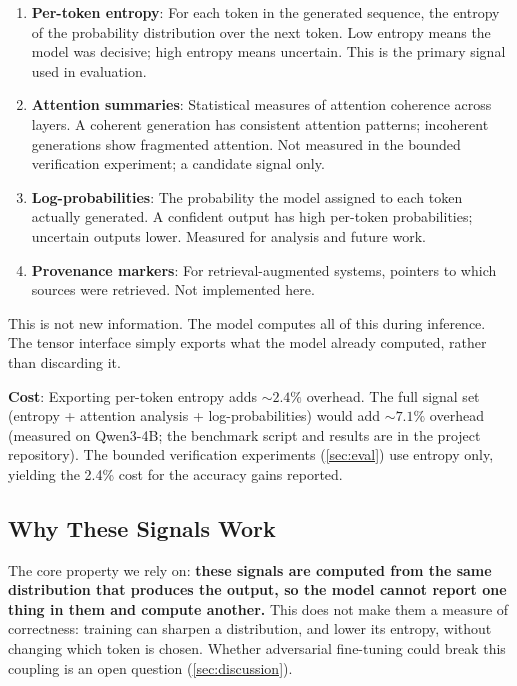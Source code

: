 \documentclass[11pt]{article}
\begin{document}
\begin{enumerate}
    \item \textbf{Per-token entropy}: For each token in the generated sequence, the entropy of the probability distribution over the next token. Low entropy means the model was decisive; high entropy means uncertain. This is the primary signal used in evaluation.

    \item \textbf{Attention summaries}: Statistical measures of attention coherence across layers. A coherent generation has consistent attention patterns; incoherent generations show fragmented attention. Not measured in the bounded verification experiment; a candidate signal only.

    \item \textbf{Log-probabilities}: The probability the model assigned to each token actually generated. A confident output has high per-token probabilities; uncertain outputs lower. Measured for analysis and future work.

    \item \textbf{Provenance markers}: For retrieval-augmented systems, pointers to which sources were retrieved. Not implemented here.
\end{enumerate}

This is not new information. The model computes all of this during inference. The tensor interface simply exports what the model already computed, rather than discarding it.

\textbf{Cost}: Exporting per-token entropy adds ${\sim}2.4\%$ overhead. The full signal set (entropy + attention analysis + log-probabilities) would add ${\sim}7.1\%$ overhead (measured on Qwen3-4B; the benchmark script and results are in the project repository). The bounded verification experiments (\autoref{sec:eval}) use entropy only, yielding the 2.4\% cost for the accuracy gains reported.

\subsection{Why These Signals Work}

The core property we rely on: \textbf{these signals are computed from the same distribution that produces the output, so the model cannot report one thing in them and compute another.} This does not make them a measure of correctness: training can sharpen a distribution, and lower its entropy, without changing which token is chosen. Whether adversarial fine-tuning could break this coupling is an open question (\autoref{sec:discussion}).
\end{document}

